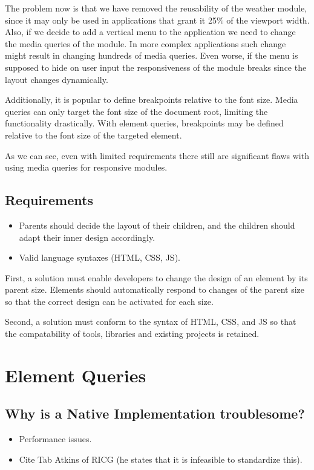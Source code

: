 \documentclass{acm_proc_article-sp}
\begin{document}
    The problem now is that we have removed the reusability of the weather module, since it may only be used in applications that grant it 25\% of the viewport width.
    Also, if we decide to add a vertical menu to the application we need to change the media queries of the module.
    In more complex applications such change might result in changing hundreds of media queries.
    Even worse, if the menu is supposed to hide on user input the responsiveness of the module breaks since the layout changes dynamically.

    Additionally, it is popular to define breakpoints relative to the font size.
    Media queries can only target the font size of the document root, limiting the functionality drastically.
    With element queries, breakpoints may be defined relative to the font size of the targeted element.

    As we can see, even with limited requirements there still are significant flaws with using media queries for responsive modules.

    \subsection{Requirements}
      \begin{itemize}
        \item Parents should decide the layout of their children, and the children should adapt their inner design accordingly.
        \item Valid language syntaxes (HTML, CSS, JS).
      \end{itemize}

    First, a solution must enable developers to change the design of an element by its parent size.
    Elements should automatically respond to changes of the parent size so that the correct design can be activated for each size.

    Second, a solution must conform to the syntax of HTML, CSS, and JS so that the compatability of tools, libraries and existing projects is retained.

\section{Element Queries}

  \subsection{Why is a Native Implementation troublesome?}
    \begin{itemize}
      \item Performance issues.
      \item Cite Tab Atkins of RICG (he states that it is infeasible to standardize this).
    \end{itemize}
\end{document}
